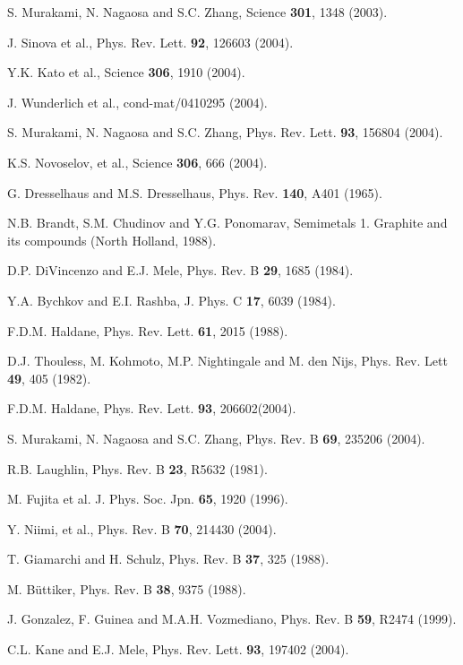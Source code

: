 \documentclass[twocolumn,showpacs,floatfix,prl]{revtex4}
\begin{document}
\begin{thebibliography}{10}


 S. Murakami, N. Nagaosa and S.C. Zhang, Science
{\bf 301}, 1348 (2003).

 J. Sinova et al., Phys. Rev. Lett. {\bf 92}, 126603
(2004).

Y.K. Kato et al., Science {\bf 306}, 1910 (2004).

J. Wunderlich et al., cond-mat/0410295 (2004).

S. Murakami, N. Nagaosa and S.C. Zhang, Phys. Rev. Lett. {\bf 93},
156804 (2004).

K.S. Novoselov, et al., Science {\bf 306}, 666 (2004).

 G. Dresselhaus and M.S. Dresselhaus, Phys. Rev.
{\bf 140}, A401 (1965).

  N.B. Brandt, S.M. Chudinov and Y.G. Ponomarav,
Semimetals 1. Graphite and its compounds (North Holland, 1988).

D.P. DiVincenzo and E.J. Mele, Phys. Rev. B {\bf 29}, 1685 (1984).

Y.A. Bychkov and E.I. Rashba, J. Phys. C {\bf 17}, 6039 (1984).

F.D.M. Haldane, Phys. Rev. Lett. {\bf 61}, 2015 (1988).

D.J. Thouless, M. Kohmoto, M.P. Nightingale and M. den Nijs, Phys.
Rev. Lett {\bf 49}, 405 (1982).

F.D.M. Haldane, Phys. Rev. Lett. {\bf 93}, 206602(2004).

  S. Murakami, N. Nagaosa and S.C. Zhang, Phys.
Rev. B {\bf 69}, 235206 (2004).

 R.B. Laughlin, Phys. Rev. B {\bf 23}, R5632 (1981).

  M. Fujita et al. J. Phys. Soc. Jpn. {\bf 65}, 1920 (1996).

  Y. Niimi, et al., Phys. Rev. B {\bf 70}, 214430 (2004).

 T. Giamarchi and H. Schulz, Phys. Rev. B {\bf 37}, 325
(1988).

  M. B\"uttiker, Phys. Rev. B {\bf 38}, 9375
(1988).

  J. Gonzalez, F. Guinea and M.A.H. Vozmediano, Phys.
Rev. B {\bf 59}, R2474 (1999).

  C.L. Kane and E.J. Mele, Phys. Rev. Lett. {\bf
93}, 197402 (2004).
\end{thebibliography}
\end{document}
